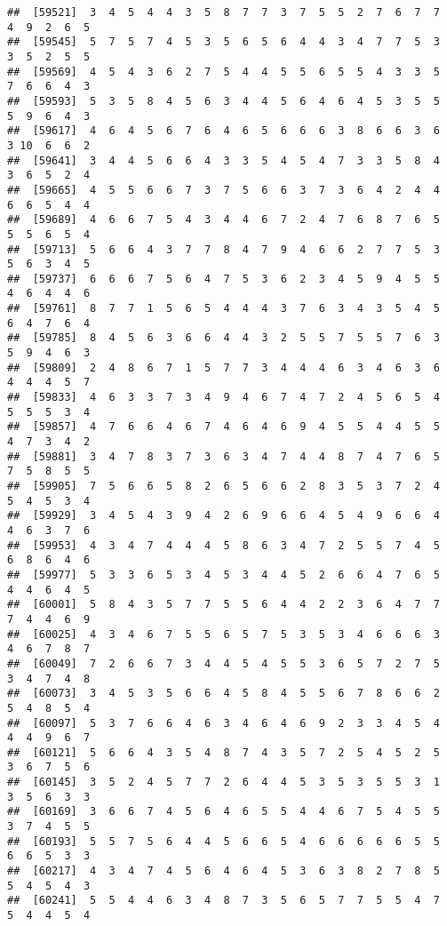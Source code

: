 \documentclass[
]{book}
\begin{document}
\begin{verbatim}
##  [59521]  3  4  5  4  4  3  5  8  7  7  3  7  5  5  2  7  6  7  7  4  9  2  6  5
##  [59545]  5  7  5  7  4  5  3  5  6  5  6  4  4  3  4  7  7  5  3  3  5  2  5  5
##  [59569]  4  5  4  3  6  2  7  5  4  4  5  5  6  5  5  4  3  3  5  7  6  6  4  3
##  [59593]  5  3  5  8  4  5  6  3  4  4  5  6  4  6  4  5  3  5  5  5  9  6  4  3
##  [59617]  4  6  4  5  6  7  6  4  6  5  6  6  6  3  8  6  6  3  6  3 10  6  6  2
##  [59641]  3  4  4  5  6  6  4  3  3  5  4  5  4  7  3  3  5  8  4  3  6  5  2  4
##  [59665]  4  5  5  6  6  7  3  7  5  6  6  3  7  3  6  4  2  4  4  6  6  5  4  4
##  [59689]  4  6  6  7  5  4  3  4  4  6  7  2  4  7  6  8  7  6  5  5  5  6  5  4
##  [59713]  5  6  6  4  3  7  7  8  4  7  9  4  6  6  2  7  7  5  3  5  6  3  4  5
##  [59737]  6  6  6  7  5  6  4  7  5  3  6  2  3  4  5  9  4  5  5  4  6  4  4  6
##  [59761]  8  7  7  1  5  6  5  4  4  4  3  7  6  3  4  3  5  4  5  6  4  7  6  4
##  [59785]  8  4  5  6  3  6  6  4  4  3  2  5  5  7  5  5  7  6  3  5  9  4  6  3
##  [59809]  2  4  8  6  7  1  5  7  7  3  4  4  4  6  3  4  6  3  6  4  4  4  5  7
##  [59833]  4  6  3  3  7  3  4  9  4  6  7  4  7  2  4  5  6  5  4  5  5  5  3  4
##  [59857]  4  7  6  6  4  6  7  4  6  4  6  9  4  5  5  4  4  5  5  4  7  3  4  2
##  [59881]  3  4  7  8  3  7  3  6  3  4  7  4  4  8  7  4  7  6  5  7  5  8  5  5
##  [59905]  7  5  6  6  5  8  2  6  5  6  6  2  8  3  5  3  7  2  4  5  4  5  3  4
##  [59929]  3  4  5  4  3  9  4  2  6  9  6  6  4  5  4  9  6  6  4  4  6  3  7  6
##  [59953]  4  3  4  7  4  4  4  5  8  6  3  4  7  2  5  5  7  4  5  6  8  6  4  6
##  [59977]  5  3  3  6  5  3  4  5  3  4  4  5  2  6  6  4  7  6  5  4  4  6  4  5
##  [60001]  5  8  4  3  5  7  7  5  5  6  4  4  2  2  3  6  4  7  7  7  4  4  6  9
##  [60025]  4  3  4  6  7  5  5  6  5  7  5  3  5  3  4  6  6  6  3  4  6  7  8  7
##  [60049]  7  2  6  6  7  3  4  4  5  4  5  5  3  6  5  7  2  7  5  3  4  7  4  8
##  [60073]  3  4  5  3  5  6  6  4  5  8  4  5  5  6  7  8  6  6  2  5  4  8  5  4
##  [60097]  5  3  7  6  6  4  6  3  4  6  4  6  9  2  3  3  4  5  4  4  4  9  6  7
##  [60121]  5  6  6  4  3  5  4  8  7  4  3  5  7  2  5  4  5  2  5  3  6  7  5  6
##  [60145]  3  5  2  4  5  7  7  2  6  4  4  5  3  5  3  5  5  3  1  3  5  6  3  3
##  [60169]  3  6  6  7  4  5  6  4  6  5  5  4  4  6  7  5  4  5  5  3  7  4  5  5
##  [60193]  5  5  7  5  6  4  4  5  6  6  5  4  6  6  6  6  6  5  5  6  6  5  3  3
##  [60217]  4  3  4  7  4  5  6  4  6  4  5  3  6  3  8  2  7  8  5  5  4  5  4  3
##  [60241]  5  5  4  4  6  3  4  8  7  3  5  6  5  7  7  5  5  4  7  5  4  4  5  4

\end{verbatim}
\end{document}
